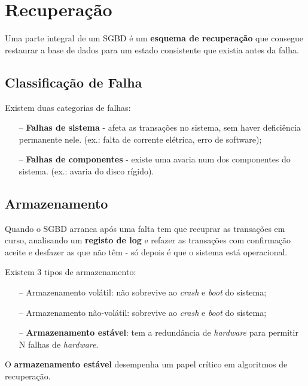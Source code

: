 \documentclass[oneside]{book}
\theoremstyle{definition}
\begin{document}
\section{Recuperação}
Uma parte integral de um SGBD é um \textbf{esquema de recuperação} que consegue restaurar a base de dados para um estado consistente que existia antes da falha.

\subsection{Classificação de Falha}
Existem duas categorias de falhas:
\begin{itemize}
    \itemsep 0cm
    \item[--] \textbf{Falhas de sistema} - afeta as transações no sistema, sem haver deficiência permanente nele. (ex.: falta de corrente elétrica, erro de software);
    \item[--] \textbf{Falhas de componentes} - existe uma avaria num dos componentes do sistema. (ex.: avaria do disco rígido).
\end{itemize}

\subsection{Armazenamento}
Quando o SGBD arranca após uma falta tem que recuprar as transações em curso, analisando um \textbf{registo de log} e refazer as transações com confirmação aceite e desfazer as que não têm - só depois é que o sistema está operacional.

Existem 3 tipos de armazenamento:
\begin{itemize}
    \itemsep 0cm
    \item[--] Armazenamento volátil: não sobrevive ao \textit{crash} e \textit{boot} do sistema;
    \item[--] Armazenamento não-volátil: sobrevive ao \textit{crash} e \textit{boot} do sistema;
    \item[--] \textbf{Armazenamento estável}: tem a redundância de \textit{hardware} para permitir N falhas de \textit{hardware}.
\end{itemize}

O \textbf{armazenamento estável} desempenha um papel crítico em algoritmos de recuperação.
\end{document}
